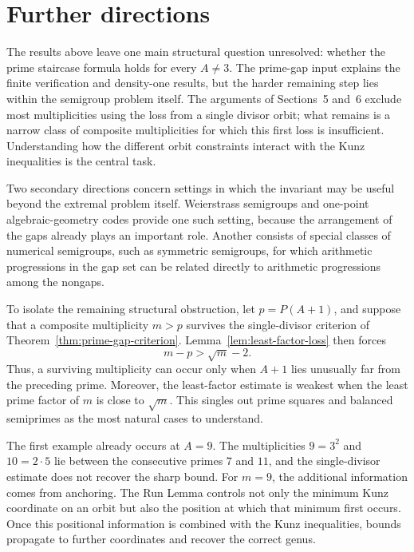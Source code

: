 \documentclass[11pt]{article}
\theoremstyle{plain}
\theoremstyle{definition}
\theoremstyle{remark}
\begin{document}
\section{Further directions}\label{sec:further}

The results above leave one main structural question unresolved: whether the
prime staircase formula holds for every \(A\neq 3\).  The prime-gap input
explains the finite verification and density-one results, but the harder
remaining step lies within the semigroup problem itself.  The arguments of
Sections~5 and~6 exclude most multiplicities using the loss from a single
divisor orbit; what remains is a narrow class of composite multiplicities for
which this first loss is insufficient.  Understanding how the different
orbit constraints interact with the Kunz inequalities is the central task.

Two secondary directions concern settings in which the invariant may be
useful beyond the extremal problem itself.  Weierstrass semigroups and
one-point algebraic-geometry codes provide one such setting, because the
arrangement of the gaps already plays an important role.  Another consists of
special classes of numerical semigroups, such as symmetric semigroups, for
which arithmetic progressions in the gap set can be related directly to
arithmetic progressions among the nongaps.

To isolate the remaining structural obstruction, let \(p=P(A+1)\), and
suppose that a composite multiplicity \(m>p\) survives the single-divisor
criterion of Theorem~\ref{thm:prime-gap-criterion}.
Lemma~\ref{lem:least-factor-loss} then forces
\[
    m-p>\sqrt m-2.
\]
Thus, a surviving multiplicity can occur only when \(A+1\) lies unusually far
from the preceding prime.  Moreover, the least-factor estimate is weakest when
the least prime factor of \(m\) is close to \(\sqrt m\).  This singles out prime
squares and balanced semiprimes as the most natural cases to understand.

The first example already occurs at \(A=9\).  The multiplicities
\(9=3^2\) and \(10=2\cdot 5\) lie between the consecutive primes \(7\) and
\(11\), and the single-divisor estimate does not recover the sharp bound.
For \(m=9\), the additional information comes from anchoring.  The Run Lemma
controls not only the minimum Kunz coordinate on an orbit but also the
position at which that minimum first occurs.  Once this positional information
is combined with the Kunz inequalities, bounds propagate to further
coordinates and recover the correct genus.
\end{document}
